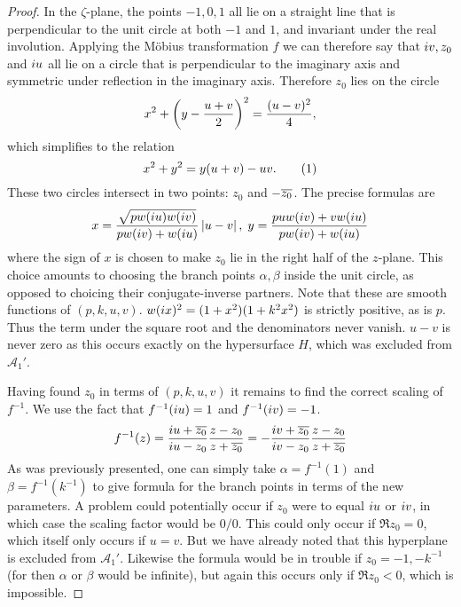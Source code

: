 \begin{lem}
\begin{proof}
In the $ζ$-plane, the points $-1,0,1$ all lie on a straight line that is perpendicular to the unit circle at both $-1$ and $1$, and invariant under the real involution. Applying the M\"obius transformation $f$ we can therefore say that $i v, z_0$ and $i u$ all lie on a circle that is perpendicular to the imaginary axis and symmetric under reflection in the imaginary axis. Therefore $z_0$ lies on the circle
\[
x^2 + \left( y - \frac{u+v}{2} \right)^2 = \frac{(u-v)^2}{4},
\]
which simplifies to the relation
\[
x^2 + y^2 = y(u+v) - uv. \labelthis{eqn:z_0_circle}
\]
These two circles intersect in two points: $z_0$ and $-\overline{z_0}$. The precise formulas are
\[
x = \frac{\sqrt{pw(i u)w(i v)}}{pw(i v) + w(i u)} \left|u-v\right|,\; y = \frac{puw(i v) + vw(i u)}{pw(i v) + w(i u)}
\]
where the sign of $x$ is chosen to make $z_0$ lie in the right half of the $z$-plane. This choice amounts to choosing the branch points $α,β$ inside the unit circle, as opposed to choicing their conjugate-inverse partners. Note that these are smooth functions of $(p,k,u,v)$. $w(i x)^2 = (1+x^2)(1+k^2x^2)$ is strictly positive, as is $p$. Thus the term under the square root and the denominators never vanish. $u-v$ is never zero as this occurs exactly on the hypersurface $H$, which was excluded from $\mathcal{A}_1'$.

Having found $z_0$ in terms of $(p,k,u,v)$ it remains to find the correct scaling of $f^{-1}$. We use the fact that $f^{-1}(i u) = 1$ and $f^{-1}(i v) = -1$.
\[
f^{-1}(z)
=  \frac{i u + \overline{z_0}}{i u - z_0} \frac{z-z_0}{z + \overline{z_0}}
=  -\frac{i v + \overline{z_0}}{i v - z_0} \frac{z-z_0}{z + \overline{z_0}}
\]
As was previously presented, one can simply take $α = f^{-1}(1)$ and $β = f^{-1}(k^{-1})$ to give formula for the branch points in terms of the new parameters. A problem could potentially occur if $z_0$ were to equal $i u$ or $i v$, in which case the scaling factor would be $0/0$. This could only occur if $\Re{z_0}=0$, which itself only occurs if $u=v$. But we have already noted that this hyperplane is excluded from $\mathcal{A}_1'$. Likewise the formula would be in trouble if $z_0 = -1, -k^{-1}$ (for then $α$ or $β$ would be infinite), but again this occurs only if $\Re{z_0} < 0$, which is impossible.


\end{proof}
\end{lem}
